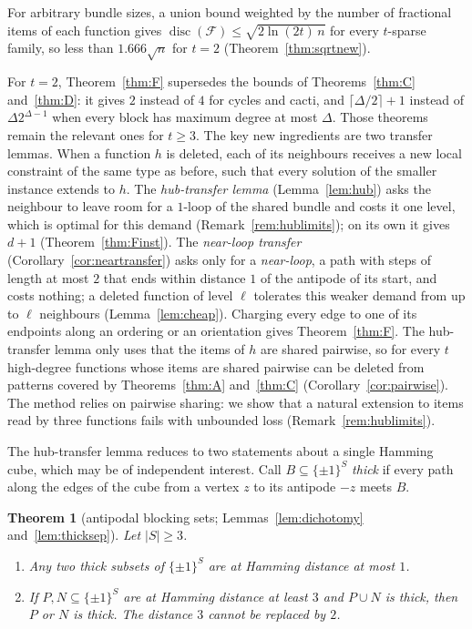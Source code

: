 \documentclass[11pt,letterpaper]{article}
\newtheorem{theorem}{Theorem}[section]
\theoremstyle{definition}
\newcommand{\cF}{\mathcal{F}}
\newcommand{\cube}[1]{\{\pm1\}^{#1}}
\DeclareMathOperator{\disc}{disc}
\begin{document}
For arbitrary bundle sizes, a union bound weighted by the number of fractional items of each function
gives $\disc(\cF)\le\sqrt{2\ln(2t)\,n}$ for every $t$-sparse family, so less than $1.666\sqrt n$ for $t=2$
(Theorem~\ref{thm:sqrtnew}).

For $t=2$, Theorem~\ref{thm:F} supersedes the bounds of Theorems~\ref{thm:C} and~\ref{thm:D}: it
gives $2$ instead of $4$ for cycles and cacti, and $\lceil\Delta/2\rceil+1$ instead of $\Delta2^{\Delta-1}$ when
every block has maximum degree at most $\Delta$. Those theorems remain the relevant ones for
$t\ge3$. The key new ingredients are two transfer lemmas. When a function $h$ is deleted, each of its
neighbours receives a new local constraint of the same type as before, such that every solution of
the smaller instance extends to $h$. The \emph{hub-transfer lemma} (Lemma~\ref{lem:hub}) asks the
neighbour to leave room for a $1$-loop of the shared bundle and costs it one level, which is optimal
for this demand (Remark~\ref{rem:hublimits}); on its own it gives $d+1$
(Theorem~\ref{thm:Finst}). The \emph{near-loop transfer} (Corollary~\ref{cor:neartransfer}) asks only
for a \emph{near-loop}, a path with steps of length at most $2$ that ends within distance $1$ of the
antipode of its start, and costs nothing; a deleted function of level $\ell$ tolerates this weaker
demand from up to $\ell$ neighbours (Lemma~\ref{lem:cheap}). Charging every edge to one of its
endpoints along an ordering or an orientation gives Theorem~\ref{thm:F}. The
hub-transfer lemma only uses that the items of $h$ are shared pairwise, so for every $t$ high-degree functions
whose items are shared pairwise can be deleted from patterns covered by Theorems~\ref{thm:A}
and~\ref{thm:C} (Corollary~\ref{cor:pairwise}). The method relies on pairwise sharing: we show that a
natural extension to items read by three functions fails with unbounded loss
(Remark~\ref{rem:hublimits}).

The hub-transfer lemma reduces to two statements about a single Hamming cube, which may be of
independent interest. Call $B\subseteq\cube S$ \emph{thick} if every path along the edges of the
cube from a vertex $z$ to its antipode $-z$ meets $B$.

\begin{theorem}[antipodal blocking sets; Lemmas~\ref{lem:dichotomy} and~\ref{lem:thicksep}]\label{thm:thick-intro}
Let $|S|\ge3$.
\begin{enumerate}[label=(\alph*),itemsep=0pt]
\item Any two thick subsets of $\cube S$ are at Hamming distance at most $1$.
\item If $P,N\subseteq\cube S$ are at Hamming distance at least $3$ and $P\cup N$ is thick, then $P$
or $N$ is thick. The distance $3$ cannot be replaced by $2$.
\end{enumerate}
\end{theorem}
\end{document}
